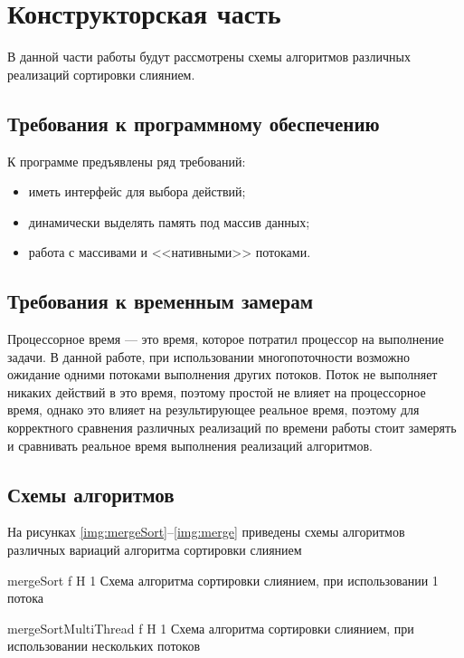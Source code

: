 \chapter{Конструкторская часть}
В данной части работы будут рассмотрены схемы алгоритмов различных реализаций сортировки слиянием.

\section{Требования к программному обеспечению}

К программе предъявлены ряд требований:

\begin{itemize}
	\item иметь интерфейс для выбора действий;
	\item динамически выделять память под массив данных;
	\item работа с массивами и <<нативными>> потоками.
\end{itemize}

\section{Требования к временным замерам}
Процессорное время --- это время, которое потратил процессор  на выполнение задачи. В данной работе, при использовании многопоточности возможно
ожидание одними потоками выполнения других потоков. Поток не выполняет
никаких действий в это время, поэтому простой не влияет на процессорное время, однако это влияет на результирующее реальное время, поэтому для корректного сравнения различных реализаций  по времени работы стоит замерять и сравнивать реальное время
выполнения реализаций алгоритмов.

\section{Схемы алгоритмов}

На рисунках \ref{img:mergeSort}--\ref{img:merge} приведены схемы алгоритмов различных вариаций алгоритма сортировки слиянием

{mergeSort} %
{f} %
{H} %
{1\textwidth} %
{Схема алгоритма сортировки слиянием, при использовании 1 потока} %

{mergeSortMultiThread} %
{f} %
{H} %
{1\textwidth} %
{Схема алгоритма сортировки слиянием, при использовании нескольких потоков} %

